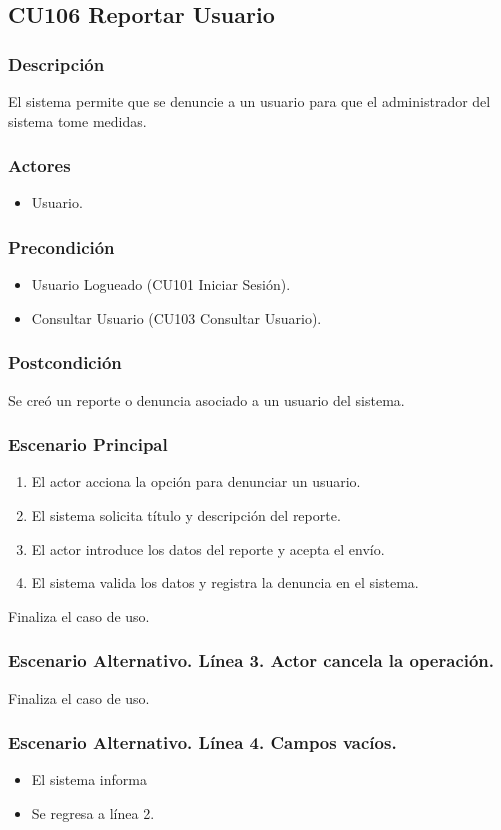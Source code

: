 \subsection{CU106 Reportar Usuario}
\subsubsection{Descripci\'{o}n}
El sistema permite que se denuncie a un usuario para que el administrador del sistema tome medidas.
\subsubsection{Actores}
\begin{itemize}
\item Usuario.
\end{itemize}
\subsubsection{Precondici\'{o}n}
\begin{itemize}
\item Usuario Logueado (CU101 Iniciar Sesi\'{o}n).
\item Consultar Usuario (CU103 Consultar Usuario).
\end{itemize}
\subsubsection{Postcondici\'{o}n}
Se cre\'{o} un reporte o denuncia asociado a un usuario del sistema.
\subsubsection{Escenario Principal}
\begin{enumerate}
\item El actor acciona la opci\'{o}n para denunciar un usuario.
\item El sistema solicita t\'{i}tulo y descripci\'{o}n del reporte.
\item El actor introduce los datos del reporte y acepta el env\'{i}o.
\item El sistema valida los datos y registra la denuncia en el sistema.
\end{enumerate}
Finaliza el caso de uso.
\subsubsection{Escenario Alternativo. L\'{i}nea 3. Actor cancela la operaci\'{o}n.}
Finaliza el caso de uso.
\subsubsection{Escenario Alternativo. L\'{i}nea 4. Campos vac\'{i}os.}
\begin{itemize}
\setcounter{enumi}{4}
\item El sistema informa
\item Se regresa a l\'{i}nea 2.
\end{itemize}
